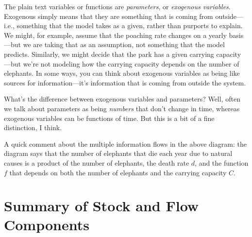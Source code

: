 The plain text variables or functions are {\it parameters}, or {\it exogenous variables}.  Exogenous simply means that they are something that is coming from outside---i.e., something that the model takes as a given, rather than purports to explain.  We might, for example, assume that the poaching rate changes on a yearly basis---but we are taking that as an assumption, not something that the model predicts.  Similarly, we might decide that the park has a given carrying capacity ---but we're not modeling how the carrying capacity depends on the number of elephants.  In some ways, you can think about exogenous variables as being like sources for information---it's information that is coming from outside the system.

What's the difference between exogenous variables and parameters?  Well, often we talk about parameters as being {\it numbers} that don't change in time, whereas exogenous variables can be functions of time.  But this is a bit of a fine distinction, I think.

A quick comment about the multiple information flows in the above diagram:  the diagram says that the number of elephants that die each year due to natural causes is a product of the number of elephants, the death rate $d$, and the function $f$ that depends on both the number of elephants and the carrying capacity $C$.

\vfill

\pagebreak

\section{Summary of Stock and Flow Components}

